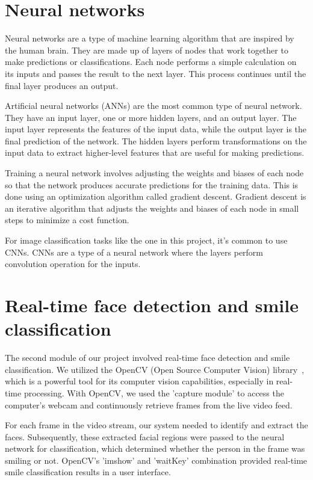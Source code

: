 \documentclass[12pt,a4paper,english
]{tunithesis}
\begin{document}
\setcounter{page}{1} 
\section{Neural networks}
Neural networks are a type of machine learning algorithm that are inspired by the human brain. They are made up of layers of nodes that work together to make predictions or classifications. Each node performs a simple calculation on its inputs and passes the result to the next layer. This process continues until the final layer produces an output.

Artificial neural networks (ANNs) are the most common type of neural network. They have an input layer, one or more hidden layers, and an output layer. The input layer represents the features of the input data, while the output layer is the final prediction of the network. The hidden layers perform transformations on the input data to extract higher-level features that are useful for making predictions.

Training a neural network involves adjusting the weights and biases of each node so that the network produces accurate predictions for the training data. This is done using an optimization algorithm called gradient descent. Gradient descent is an iterative algorithm that adjusts the weights and biases of each node in small steps to minimize a cost function.

For image classification tasks like the one in this project, it's common to use CNNs. CNNs are a type of a neural network where the layers perform convolution operation for the inputs.~\cite{dlbook}

\section{Real-time face detection and smile classification}
The second module of our project involved real-time face detection and smile classification. We utilized the OpenCV (Open Source Computer Vision) library~\cite{opencv_library}, which is a powerful tool for its computer vision capabilities,  especially in real-time processing. With OpenCV, we used the 'capture module' to access the computer's webcam and continuously retrieve frames from the live video feed.

For each frame in the video stream, our system needed to identify and extract the faces. Subsequently, these extracted facial regions were passed to the neural network for classification, which determined whether the person in the frame was smiling or not. OpenCV's 'imshow' and 'waitKey' combination provided real-time smile classification results in a user interface.
\end{document}
